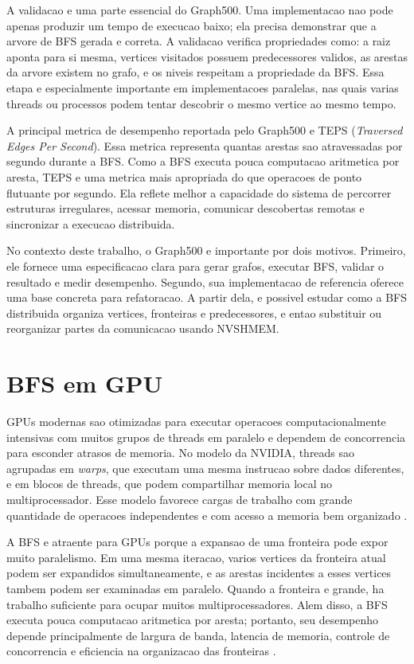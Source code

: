 \documentclass{article}
\begin{document}
A validacao e uma parte essencial do Graph500. Uma implementacao nao pode apenas
produzir um tempo de execucao baixo; ela precisa demonstrar que a arvore de BFS
gerada e correta. A validacao verifica propriedades como: a raiz aponta para si
mesma, vertices visitados possuem predecessores validos, as arestas da arvore
existem no grafo, e os niveis respeitam a propriedade da BFS. Essa etapa e
especialmente importante em implementacoes paralelas, nas quais varias threads
ou processos podem tentar descobrir o mesmo vertice ao mesmo tempo.

A principal metrica de desempenho reportada pelo Graph500 e TEPS
(\textit{Traversed Edges Per Second}). Essa metrica representa quantas arestas
sao atravessadas por segundo durante a BFS. Como a BFS executa pouca computacao
aritmetica por aresta, TEPS e uma metrica mais apropriada do que operacoes de
ponto flutuante por segundo. Ela reflete melhor a capacidade do sistema de
percorrer estruturas irregulares, acessar memoria, comunicar descobertas remotas
e sincronizar a execucao distribuida.

No contexto deste trabalho, o Graph500 e importante por dois motivos. Primeiro,
ele fornece uma especificacao clara para gerar grafos, executar BFS, validar o
resultado e medir desempenho. Segundo, sua implementacao de referencia oferece
uma base concreta para refatoracao. A partir dela, e possivel estudar como a BFS
distribuida organiza vertices, fronteiras e predecessores, e entao substituir ou
reorganizar partes da comunicacao usando NVSHMEM.

\section{BFS em GPU}
GPUs modernas sao otimizadas para executar operacoes computacionalmente intensivas 
com muitos grupos de threads em paralelo e dependem de concorrencia para esconder 
atrasos de memoria. No modelo da NVIDIA, threads sao agrupadas em \textit{warps}, 
que executam uma mesma instrucao sobre dados diferentes, e em blocos de threads, 
que podem compartilhar memoria local no multiprocessador. Esse modelo favorece 
cargas de trabalho com grande quantidade de operacoes independentes e com acesso 
a memoria bem organizado \cite{merrillgpu}.

A BFS e atraente para GPUs porque a expansao de uma fronteira pode expor muito
paralelismo. Em uma mesma iteracao, varios vertices da fronteira atual podem ser
expandidos simultaneamente, e as arestas incidentes a esses vertices tambem podem
ser examinadas em paralelo. Quando a fronteira e grande, ha trabalho suficiente
para ocupar muitos multiprocessadores. Alem disso, a BFS executa pouca computacao
aritmetica por aresta; portanto, seu desempenho depende principalmente de largura
de banda, latencia de memoria, controle de concorrencia e eficiencia na
organizacao das fronteiras \cite{merrillgpu}.
\end{document}
